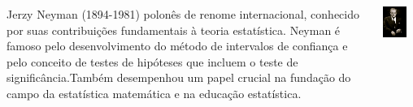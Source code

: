 \documentclass[12pt]{beamer}
\begin{document}
\begin{frame}{}
	\begin{block}{}
		\begin{columns} %
			
			\begin{column}{0.6\textwidth} %
				\vfill
				\centering
				\justifying
				Jerzy Neyman (1894-1981) polonês de renome internacional, conhecido por suas contribuições fundamentais à teoria estatística. Neyman é famoso pelo desenvolvimento do método de intervalos de confiança e pelo conceito de testes de hipóteses que incluem o teste de significância.Também desempenhou um papel crucial na fundação do campo da estatística matemática e na educação estatística.
			\end{column}
			
			\begin{column}{0.3\textwidth} %
				\includegraphics[width=0.7\textwidth]{figs/Neyman.jpg} %
			\end{column}
			
		\end{columns}
	\end{block}
\end{frame}
\end{document}
